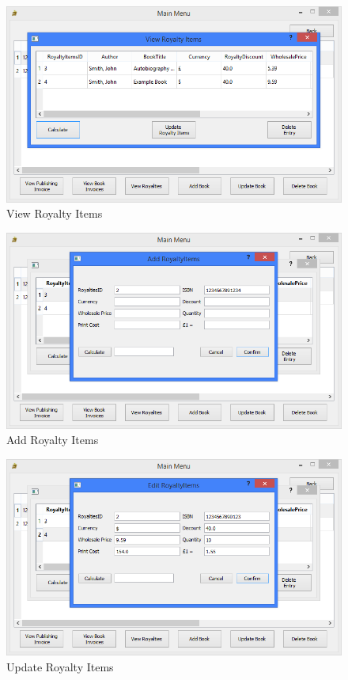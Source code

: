 \begin{figure}[H]
    \caption{View Royalty Items} \label{fig:ViewRoyaltyItems}
    \includegraphics[width=\textwidth]{./Maintenance/UserInterface/ViewRoyaltyItems.png}
\end{figure}

\begin{figure}[H]
    \caption{Add Royalty Items} \label{fig:AddRoyaltyItems}
    \includegraphics[width=\textwidth]{./Maintenance/UserInterface/AddRoyaltyItems.png}
\end{figure}

\begin{figure}[H]
    \caption{Update Royalty Items} \label{fig:UpdateRoyaltyItems}
    \includegraphics[width=\textwidth]{./Maintenance/UserInterface/UpdateRoyaltyItems.png}
\end{figure}

